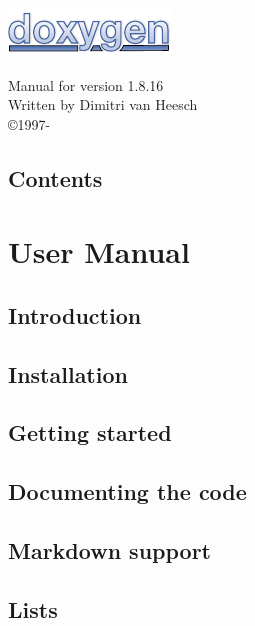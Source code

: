 \documentclass{book}
\newcommand{\+}{\discretionary{\mbox{\scriptsize$\hookleftarrow$}}{}{}}
\newcommand{\thisyear}{\the\year}
\begin{document}
\begin{titlepage}
\includegraphics[width=\textwidth]{doxygen_logo}
\begin{center}
Manual for version 1.8.16\\[2ex]
Written by Dimitri van Heesch\\[2ex]
\copyright 1997-\thisyear
\end{center}
\end{titlepage}
\clearemptydoublepage
{}
\chapter*{Contents}
\tableofcontents
\clearemptydoublepage
{}
\part{User Manual}
\chapter{Introduction}\label{intro}\hypertarget{intro}{}
\chapter{Installation}\label{install}\hypertarget{install}{}
\chapter{Getting started}\label{starting}\hypertarget{starting}{}
\chapter{Documenting the code}\label{docblocks}\hypertarget{docblocks}{}
\chapter{Markdown support}\label{markdown}\hypertarget{markdown}{}
\chapter{Lists}\label{lists}\hypertarget{lists}{}
\end{document}
